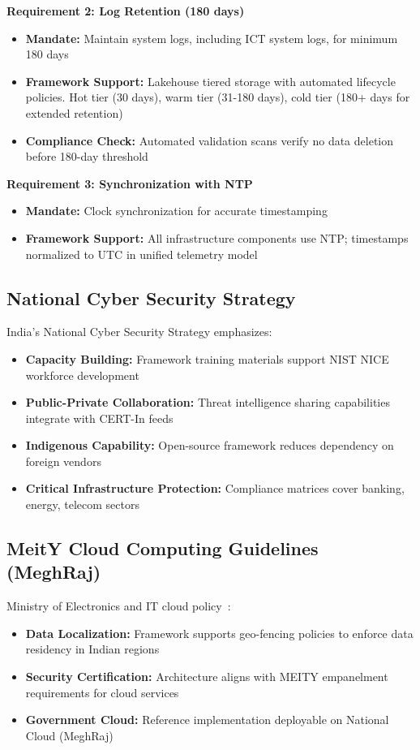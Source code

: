 \textbf{Requirement 2: Log Retention (180 days)}
\begin{itemize}
    \item \textbf{Mandate:} Maintain system logs, including ICT system logs, for minimum 180 days
    \item \textbf{Framework Support:} Lakehouse tiered storage with automated lifecycle policies. Hot tier (30 days), warm tier (31-180 days), cold tier (180+ days for extended retention)
    \item \textbf{Compliance Check:} Automated validation scans verify no data deletion before 180-day threshold
\end{itemize}

\textbf{Requirement 3: Synchronization with NTP}
\begin{itemize}
    \item \textbf{Mandate:} Clock synchronization for accurate timestamping
    \item \textbf{Framework Support:} All infrastructure components use NTP; timestamps normalized to UTC in unified telemetry model
\end{itemize}

\subsection{National Cyber Security Strategy}
India's National Cyber Security Strategy emphasizes:
\begin{itemize}
    \item \textbf{Capacity Building:} Framework training materials support NIST NICE workforce development
    \item \textbf{Public-Private Collaboration:} Threat intelligence sharing capabilities integrate with CERT-In feeds
    \item \textbf{Indigenous Capability:} Open-source framework reduces dependency on foreign vendors
    \item \textbf{Critical Infrastructure Protection:} Compliance matrices cover banking, energy, telecom sectors
\end{itemize}

\subsection{MeitY Cloud Computing Guidelines (MeghRaj)}
Ministry of Electronics and IT cloud policy~\cite{meity2017cloud}:
\begin{itemize}
    \item \textbf{Data Localization:} Framework supports geo-fencing policies to enforce data residency in Indian regions
    \item \textbf{Security Certification:} Architecture aligns with MEITY empanelment requirements for cloud services
    \item \textbf{Government Cloud:} Reference implementation deployable on National Cloud (MeghRaj)
\end{itemize}

